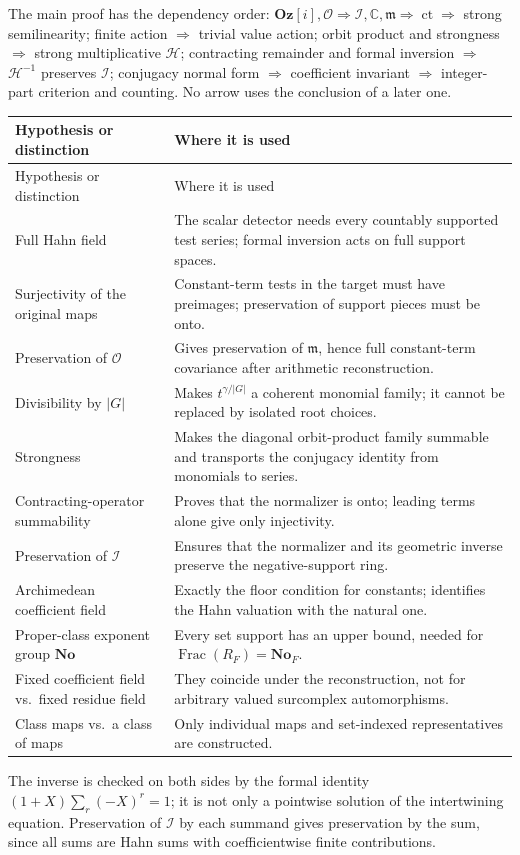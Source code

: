 \documentclass[11pt]{article}
\theoremstyle{definition}
\theoremstyle{remark}
\newcommand{\No}{\mathbf{No}}
\newcommand{\C}{\mathbb C}
\newcommand{\OO}{\mathcal O}
\newcommand{\mm}{\mathfrak m}
\newcommand{\abs}[1]{\lvert#1\rvert}
\newcommand{\Oz}{\mathbf{Oz}}
\newcommand{\ct}{\operatorname{ct}}
\newcommand{\Frac}{\operatorname{Frac}}
\newcommand{\Ineg}{\mathcal I}
\numberwithin{equation}{section}
\begin{document}
The main proof has the dependency order: $\Oz[i],\OO\Rightarrow\Ineg,\C,\mm\Rightarrow\ct
\Rightarrow$ strong semilinearity; finite action $\Rightarrow$ trivial value action;
orbit product and strongness $\Rightarrow$ strong multiplicative $\mathcal H$;
contracting remainder and formal inversion $\Rightarrow$ $\mathcal H^{-1}$ preserves $\Ineg$;
conjugacy normal form $\Rightarrow$ coefficient invariant $\Rightarrow$ integer-part
criterion and counting. No arrow uses the conclusion of a later one.
\begin{center}
\small
\begin{longtable}{@{}>{\RaggedRight\arraybackslash}p{}>{\RaggedRight\arraybackslash}p{}@{}}
\toprule
Hypothesis or distinction & Where it is used\\
\midrule
\endfirsthead
\toprule
Hypothesis or distinction & Where it is used\\
\midrule
\endhead
Full Hahn field & The scalar detector needs every countably supported test series; formal
inversion acts on full support spaces.\\
Surjectivity of the original maps & Constant-term tests in the target must have preimages;
preservation of support pieces must be onto.\\
Preservation of $\OO$ & Gives preservation of $\mm$, hence full constant-term covariance
after arithmetic reconstruction.\\
Divisibility by $\abs G$ & Makes $t^{\gamma/\abs G}$ a coherent monomial family; it cannot be
replaced by isolated root choices.\\
Strongness & Makes the diagonal orbit-product family summable and transports the conjugacy
identity from monomials to series.\\
Contracting-operator summability & Proves that the normalizer is onto; leading terms alone
give only injectivity.\\
Preservation of $\Ineg$ & Ensures that the normalizer and its geometric inverse preserve the
negative-support ring.\\
Archimedean coefficient field & Exactly the floor condition for constants; identifies the
Hahn valuation with the natural one.\\
Proper-class exponent group $\No$ & Every set support has an upper bound, needed for
$\Frac(R_F)=\No_F$.\\
Fixed coefficient field vs.\ fixed residue field & They coincide under the reconstruction,
not for arbitrary valued surcomplex automorphisms.\\
Class maps vs.\ a class of maps & Only individual maps and set-indexed representatives are
constructed.\\
\bottomrule
\end{longtable}
\end{center}
The inverse is checked on both sides by the formal identity $(1+X)\sum_r(-X)^r=1$; it is not
only a pointwise solution of the intertwining equation. Preservation of $\Ineg$ by each
summand gives preservation by the sum, since all sums are Hahn sums with coefficientwise
finite contributions.
\end{document}
